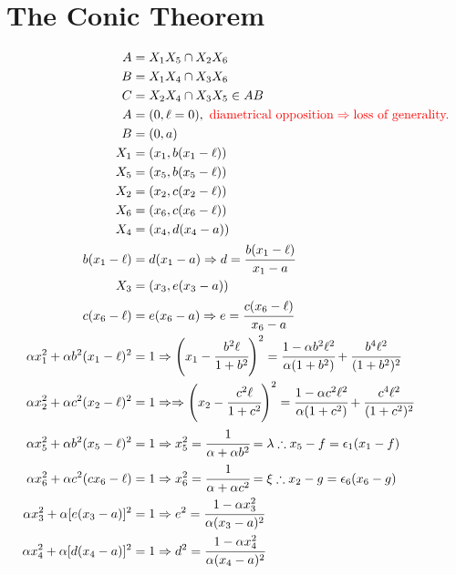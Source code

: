 \documentclass[12pt]{article}
\numberwithin{table}{section}
\begin{document}




\section{The Conic Theorem}

\begin{align}
A &= X_1 X_5 \cap X_2 X_6 \\
B &= X_1 X_4 \cap X_3 X_6 \\
C &= X_2 X_4 \cap X_3 X_5 \in AB \label{eq3} \\
A &= (0,\ell=0),{\color{red}\text{ diametrical opposition}\Rightarrow\text{loss of generality.}}\\
B &= (0,a) \\
X_1 &= (x_1, b(x_1-\ell)) \\
X_5 &= (x_5, b(x_5-\ell)) \\
X_2 &= (x_2, c(x_2-\ell)) \\
X_6 &= (x_6, c(x_6-\ell)) \\
X_4 &= (x_4, d(x_4 - a)) \\
b(x_1 - \ell) &= d(x_1 - a) \Rightarrow d = \cfrac{b (x_1 - \ell)}{x_1 - a} \\
X_3 &= (x_3, e(x_3 - a)) \\
c(x_6-\ell) &= e(x_6 - a) \Rightarrow e = \cfrac{c(x_6-\ell)}{x_6 - a} \\
\alpha x_1^2 + \alpha b^2 (x_1 -\ell)^2 &= 1 \Rightarrow \left(x_1 - \cfrac{b^2 \ell}{1 + b^2} \right)^2 = \cfrac{1 - \alpha b^2 \ell^2}{\alpha (1+b^2)} + \cfrac{b^4 \ell^2}{(1+b^2)^2}  \\
\alpha x_2^2 + \alpha c^2(x_2-\ell)^2 &= 1 \Rightarrow  \Rightarrow \left(x_2 - \cfrac{c^2 \ell}{1 + c^2} \right)^2 = \cfrac{1 - \alpha c^2 \ell^2}{\alpha (1+c^2)} + \cfrac{c^4 \ell^2}{(1+c^2)^2}\\  
\alpha x_5^2 + \alpha b^2(x_5-\ell)^2 &= 1\Rightarrow x_5^2 = \cfrac{1}{\alpha + \alpha b^2} = \lambda \therefore x_5 - f = \epsilon_1 (x_1 - f) \\
\alpha x_6^2 + \alpha c^2(cx_6-\ell) &= 1 \Rightarrow  x_6^2 =\cfrac{1}{\alpha + \alpha c^2} = \xi \therefore x_2 - g = \epsilon_6 (x_6 - g)\\
\alpha x_3^2 + \alpha [e(x_3-a)]^2 &= 1 \Rightarrow e^2 = \cfrac{1 - \alpha x_3^2 }{\alpha (x_3-a)^2} \label{eq18}\\
\alpha x_4^2 + \alpha [d(x_4-a)]^2 &= 1 \Rightarrow d^2 = \cfrac{1 - \alpha x_4^2 }{\alpha (x_4-a)^2} \label{eq19}
\end{align}
\end{document}
